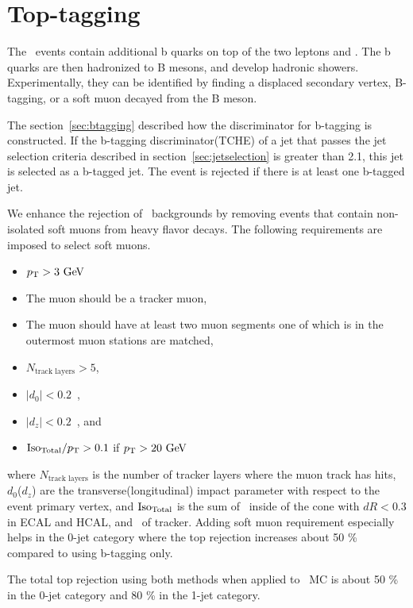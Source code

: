 \section{ Top-tagging }

The \topbkg\ events contain additional b quarks on top of 
the two leptons and \met. The b quarks are then hadronized to B mesons, 
and develop hadronic showers. Experimentally,  
they can be identified by finding a displaced secondary vertex, B-tagging,
or a soft muon decayed from the B meson. 

The section~\ref{sec:btagging} described how the discriminator for b-tagging is constructed. 
If the b-tagging discriminator(TCHE) of a jet that passes 
the jet selection criteria described in section~\ref{sec:jetselection} 
is greater than 2.1, this jet is selected as a b-tagged jet. 
The event is rejected if there is at least one b-tagged jet. 

We enhance the rejection of \topbkg\ backgrounds by removing events that contain 
non-isolated soft muons from heavy flavor decays. The following requirements are imposed to 
select soft muons. 
\begin{itemize} 
    \item $p_\mathrm{T} > 3~\mathrm{Ge\kern -0.1em V}$ 
    \item The muon should be a tracker muon,
    \item The muon should have at least two muon segments one of which is 
          in the outermost muon stations are matched,
    \item $N_{\textrm{track layers}}>5$,
    \item $|d_{0}| < 0.2$~\cm,
    \item $|d_{z}| <0.2$~\cm, and
    \item ${\rm{Iso}_{\textrm{Total}}}/{p_\mathrm{T}}>0.1$ if $p_\mathrm{T}>20~\mathrm{Ge\kern -0.1em V}$
\end{itemize} 
where $N_{\textrm{track layers}}$ is the number of tracker layers where the muon track has hits, 
$d_{0}$($d_{z}$) are the transverse(longitudinal) impact parameter with respect to 
the event primary vertex, and $\rm{Iso}_{\textrm{Total}}$ is the sum of \Et\ inside of the cone 
with $dR < 0.3$ in ECAL and HCAL, and \pt\ of tracker. Adding soft muon requirement 
especially helps in the 0-jet category where the top rejection increases 
about 50 \% compared to using b-tagging only.

The total top rejection using both methods when applied to \topbkg\ MC 
is about 50 \% in the 0-jet category and 80 \% in the 1-jet category. 



